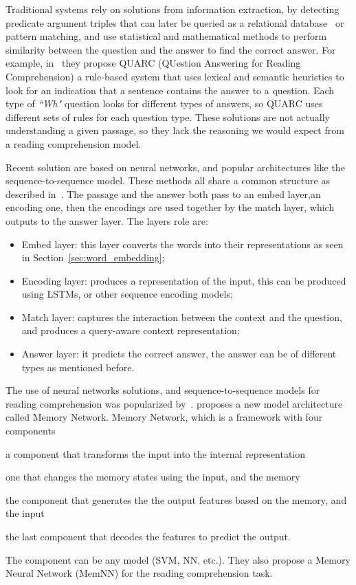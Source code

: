 Traditional systems rely on solutions from information extraction, by detecting predicate argument triples that can later be queried as a relational database~\citep{poon-etal-2010-machine} or pattern matching, and use statistical and mathematical methods to perform similarity between the question and the answer to find the correct answer. For example, in~\citep{riloff-thelen-2000-rule} they propose QUARC (QUestion Answering for Reading Comprehension) a rule-based system that uses lexical and semantic heuristics to look for an indication that a sentence contains the answer to a question. Each type of \textit{``Wh"} question looks for different types of answers, so QUARC uses different sets of rules for each question type. These solutions are not actually understanding a given passage, so they lack the reasoning we would expect from a reading comprehension model.

Recent solution are based on neural networks, and popular architectures like the sequence-to-sequence model. These methods all share a common structure as described in~\citep{qiu2019survey}. The passage and the answer both pass to an embed layer,an encoding one, then the encodings are used together by the match layer, which outputs to the answer layer. The layers role are:

\begin{itemize}[- ,noitemsep]
    \item Embed layer: this layer converts the words into their representations as seen in Section~\ref{sec:word_embedding};
    \item Encoding layer: produces a representation of the input, this can be produced using LSTMs, or other sequence encoding models;
    \item Match layer: captures the interaction between the context and the question, and produces a query-aware context representation;
    \item Answer layer: it predicts the correct answer, the answer can be of different types as mentioned before.
\end{itemize}

The use of neural networks solutions, and sequence-to-sequence models for reading comprehension was popularized by~\citep{hermann2015teaching, weston2015memory}. \cite{weston2015memory} proposes a new model architecture called Memory Network. Memory Network, which is a framework with four components \begin {enumerate*} [1) ]
\item a component that transforms the input into the internal representation 
\item one that changes the memory states using the input, and the memory
\item the component that generates the the output features based on the memory, and the input
\item the last component that decodes the features to predict the output.
\end {enumerate*} 
The component can be any model (SVM, NN, etc.). They also propose a Memory Neural Network (MemNN) for the reading comprehension task. 

